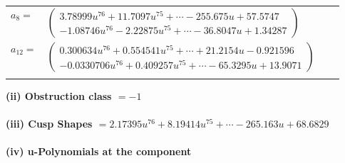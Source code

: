\documentclass[1p]{elsarticle_modified}
\theoremstyle{definition}
\begin{document}
\begin{tabular}{m{7pt} m{180pt} m{7pt} m{180pt} }
\flushright $a_{8}=$&$\begin{pmatrix}3.78999 u^{76}+11.7097 u^{75}+\cdots-255.675 u+57.5747\\-1.08746 u^{76}-2.22875 u^{75}+\cdots-36.8047 u+1.34287\end{pmatrix}$ \\
\flushright $a_{12}=$&$\begin{pmatrix}0.300634 u^{76}+0.554541 u^{75}+\cdots+21.2154 u-0.921596\\-0.0330706 u^{76}+0.409257 u^{75}+\cdots-65.3295 u+13.9071\end{pmatrix}$\\&\end{tabular}
\flushleft \textbf{(ii) Obstruction class $= -1$}\\~\\
\flushleft \textbf{(iii) Cusp Shapes $= 2.17395 u^{76}+8.19414 u^{75}+\cdots-265.163 u+68.6829$}\\~\\
\newpage\renewcommand{\arraystretch}{1}
\flushleft \textbf{(iv) u-Polynomials at the component}\newline \\
\end{document}
